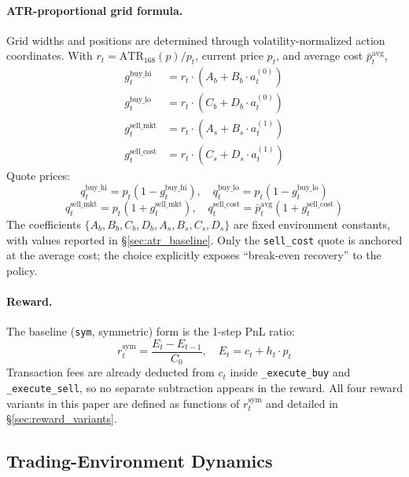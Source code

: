\documentclass[11pt, a4paper]{article}
\begin{document}
\paragraph{ATR-proportional grid formula.}
Grid widths and positions are determined through volatility-normalized action
coordinates. With $r_t = \mathrm{ATR}_{168}(p) / p_t$, current price $p_t$, and
average cost $\bar{p}^{\mathrm{avg}}_t$,
\begin{align}
g^{\mathrm{buy\_hi}}_t  &= r_t \cdot (A_b + B_b \cdot a_t^{(0)}) \\
g^{\mathrm{buy\_lo}}_t  &= r_t \cdot (C_b + D_b \cdot a_t^{(0)}) \\
g^{\mathrm{sell\_mkt}}_t &= r_t \cdot (A_s + B_s \cdot a_t^{(1)}) \\
g^{\mathrm{sell\_cost}}_t &= r_t \cdot (C_s + D_s \cdot a_t^{(1)})
\end{align}
Quote prices:
\begin{equation}
q^{\mathrm{buy\_hi}}_t = p_t (1 - g^{\mathrm{buy\_hi}}_t), \quad
q^{\mathrm{buy\_lo}}_t = p_t (1 - g^{\mathrm{buy\_lo}}_t)
\end{equation}
\begin{equation}
q^{\mathrm{sell\_mkt}}_t = p_t (1 + g^{\mathrm{sell\_mkt}}_t), \quad
q^{\mathrm{sell\_cost}}_t = \bar{p}^{\mathrm{avg}}_t (1 + g^{\mathrm{sell\_cost}}_t)
\end{equation}
The coefficients $\{A_b, B_b, C_b, D_b, A_s, B_s, C_s, D_s\}$ are fixed
environment constants, with values reported in \S\ref{sec:atr_baseline}. Only
the \texttt{sell\_cost} quote is anchored at the average cost; the choice
explicitly exposes ``break-even recovery'' to the policy.

\paragraph{Reward.}
The baseline (\texttt{sym}, symmetric) form is the 1-step PnL ratio:
\begin{equation}
r_t^{\mathrm{sym}} = \frac{E_t - E_{t-1}}{C_0}, \quad
E_t = c_t + h_t \cdot p_t
\end{equation}
Transaction fees are already deducted from $c_t$ inside
\texttt{\_execute\_buy} and \texttt{\_execute\_sell}, so no separate subtraction
appears in the reward. All four reward variants in this paper are defined as
functions of $r_t^{\mathrm{sym}}$ and detailed in \S\ref{sec:reward_variants}.

\subsection{Trading-Environment Dynamics}
\label{sec:env_dynamics}
\end{document}
